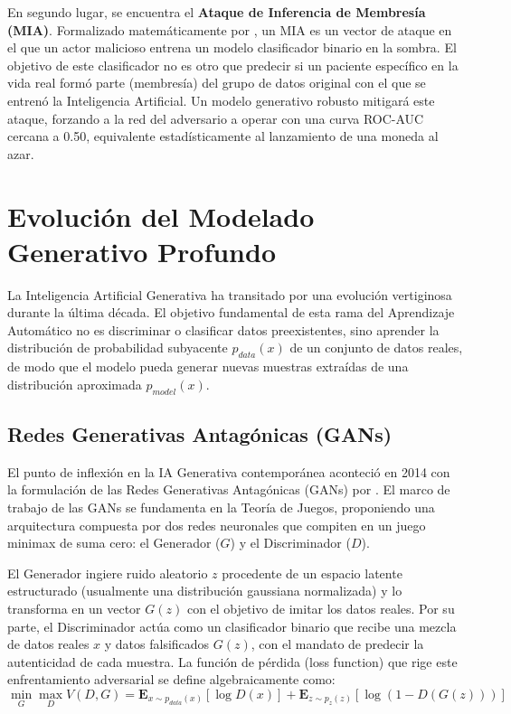 En segundo lugar, se encuentra el \textbf{Ataque de Inferencia de Membresía (MIA)}. Formalizado matemáticamente por \textcite{shokri2017mia}, un MIA es un vector de ataque en el que un actor malicioso entrena un modelo clasificador binario en la sombra. El objetivo de este clasificador no es otro que predecir si un paciente específico en la vida real formó parte (membresía) del grupo de datos original con el que se entrenó la Inteligencia Artificial. Un modelo generativo robusto mitigará este ataque, forzando a la red del adversario a operar con una curva ROC-AUC cercana a 0.50, equivalente estadísticamente al lanzamiento de una moneda al azar.

\section{Evolución del Modelado Generativo Profundo}

La Inteligencia Artificial Generativa ha transitado por una evolución vertiginosa durante la última década. El objetivo fundamental de esta rama del Aprendizaje Automático no es discriminar o clasificar datos preexistentes, sino aprender la distribución de probabilidad subyacente $p_{data}(x)$ de un conjunto de datos reales, de modo que el modelo pueda generar nuevas muestras extraídas de una distribución aproximada $p_{model}(x)$.

\subsection{Redes Generativas Antagónicas (GANs)}

El punto de inflexión en la IA Generativa contemporánea aconteció en 2014 con la formulación de las Redes Generativas Antagónicas (GANs) por \textcite{goodfellow2014gan}. El marco de trabajo de las GANs se fundamenta en la Teoría de Juegos, proponiendo una arquitectura compuesta por dos redes neuronales que compiten en un juego minimax de suma cero: el Generador ($G$) y el Discriminador ($D$).

El Generador ingiere ruido aleatorio $z$ procedente de un espacio latente estructurado (usualmente una distribución gaussiana normalizada) y lo transforma en un vector $G(z)$ con el objetivo de imitar los datos reales. Por su parte, el Discriminador actúa como un clasificador binario que recibe una mezcla de datos reales $x$ y datos falsificados $G(z)$, con el mandato de predecir la autenticidad de cada muestra. La función de pérdida (loss function) que rige este enfrentamiento adversarial se define algebraicamente como:
$$ \min_G \max_D V(D, G) = \mathbf{E}_{x \sim p_{data}(x)}[\log D(x)] + \mathbf{E}_{z \sim p_z(z)}[\log (1 - D(G(z)))] $$

